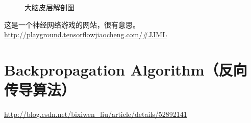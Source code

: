 \begin{figure}[htbp]
  \centering
  \caption{大脑皮层解剖图}\label{大脑皮层解剖图}
\end{figure}

这是一个神经网络游戏的网站，很有意思。\url{http://playground.tensorflowjiaocheng.com/#JJML}
\section{Backpropagation Algorithm（反向传导算法）}
\url{http://blog.csdn.net/bixiwen_liu/article/details/52892141}